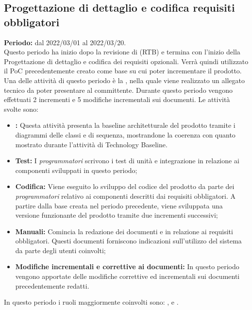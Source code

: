 
 \subsection{Progettazione di dettaglio e codifica requisiti obbligatori} \label{subsection:pianificazione_requisiti_obbligatori}
\textbf{Periodo:} dal 2022/03/01 al 2022/03/20.
\bigskip
\\Questo periodo ha inizio dopo la revisione di \RTB{} (RTB\glo{}) e termina con l'inizio della Progettazione di dettaglio e codifica dei requisiti opzionali.
Verrà quindi utilizzato il PoC\glo{} precedentemente creato come base su cui poter incrementare il prodotto.
Una delle attività di questo periodo è la \PB{}, nella quale viene realizzato un allegato tecnico da poter presentare al committente.
Durante questo periodo vengono effettuati 2 incrementi e 5 modifiche incrementali sui documenti.
Le attività svolte sono:
\begin{itemize}
  \item \textbf{\PB{}:} Questa attività presenta la baseline architetturale del prodotto tramite i diagrammi delle classi e di sequenza, mostrandone la coerenza con quanto mostrato durante l'attività di Technology Baseline.
  \item \textbf{Test:} I \textit{programmatori} scrivono i test di unità e integrazione in relazione ai componenti sviluppati in questo periodo;
  \item \textbf{Codifica:} Viene eseguito lo sviluppo del codice del prodotto da parte dei \textit{programmatori} relativo ai componenti descritti dai requisiti obbligatori.
  A partire dalla base creata nel periodo precedente, viene sviluppata una versione funzionante del prodotto tramite due incrementi successivi;
  \item \textbf{Manuali:} Comincia la redazione dei documenti \docNameVersionMU{} e \docNameVersionMS{} in relazione ai requisiti obbligatori.
  Questi documenti forniscono indicazioni sull'utilizzo del sistema da parte degli utenti coinvolti;
  \item \textbf{Modifiche incrementali e correttive ai documenti:} In questo periodo vengono apportate delle modifiche correttive ed incrementali sui documenti precedentemente redatti.
\end{itemize}
In questo periodo i ruoli maggiormente coinvolti sono: \roleDesignerLow{}, \roleProgrammerLow{} e \roleVerifierLow{}.
\bigskip
